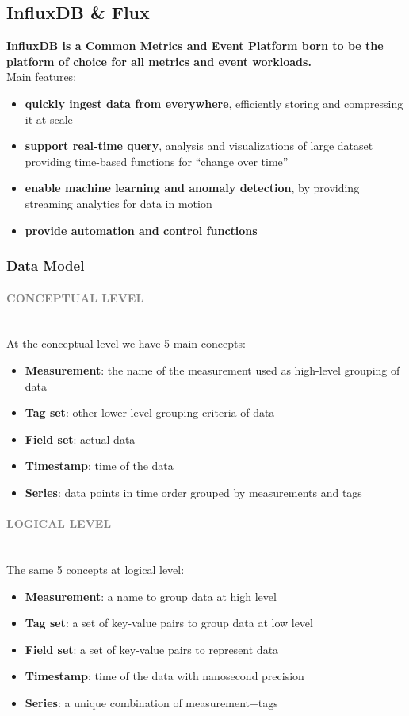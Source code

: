 \documentclass[10pt,a4paper]{article}
\newcommand{\myparagraph}[1]{\paragraph{\normalsize{\textcolor{gray}{\uppercase{\textbf{#1}}}} }\mbox{} \vspace{0.5em}\\}
\begin{document}
\subsection{InfluxDB \& Flux}
\textbf{InfluxDB is a Common Metrics and Event Platform born to be the platform of choice for all metrics and event workloads.} \\
Main features:
\begin{itemize}
	\item \textbf{quickly ingest data from everywhere}, efficiently storing and compressing it at scale
	\item \textbf{support real-time query}, analysis and visualizations of large dataset providing time-based functions for “change over time”
	\item \textbf{enable machine learning and anomaly detection}, by providing streaming analytics for data in motion
	\item \textbf{provide automation and control functions}
\end{itemize}
\subsubsection{Data Model}
\myparagraph{Conceptual Level}
At the conceptual level we have 5 main concepts:
\begin{itemize}
	\item \textbf{Measurement}: the name of the measurement used as high-level grouping of data
	\item \textbf{Tag set}: other lower-level grouping criteria of data
	\item \textbf{Field set}: actual data
	\item \textbf{Timestamp}: time of the data
	\item \textbf{Series}: data points in time order grouped by measurements and tags
\end{itemize}
\myparagraph{Logical Level}
The same 5 concepts at logical level:
\begin{itemize}
	\item \textbf{Measurement}: a name to group data at high level
	\item \textbf{Tag set}: a set of key-value pairs to group data at low level
	\item \textbf{Field set}: a set of key-value pairs to represent data
	\item \textbf{Timestamp}: time of the data with nanosecond precision
	\item \textbf{Series}: a unique combination of measurement+tags
\end{itemize}
\end{document}
